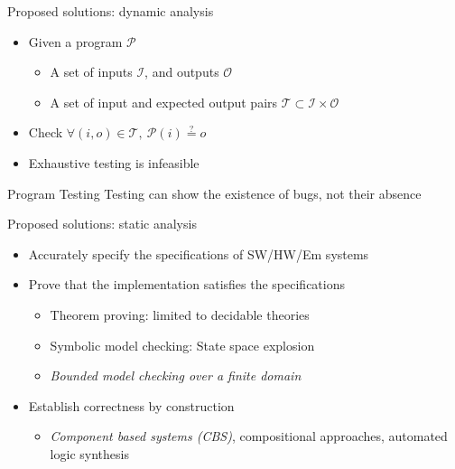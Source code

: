 \begin{frame}{Proposed solutions: dynamic analysis}
	 \begin{itemize}
	 	\item 
		 Given a program $\mathcal{P}$
		 \begin{itemize}
		   \item A set of inputs $\mathcal{I}$, and outputs $\mathcal{O}$
		   \item A set of input and expected output pairs $\mathcal{T} \subset \mathcal{I} \times \mathcal{O}$
		 \end{itemize}
		\item 
		 Check $\forall (i,o) \in \mathcal{T},~\mathcal{P}(i) \stackrel{?}{=} o$
		\item 
		 Exhaustive testing is infeasible
	 \end{itemize}
	 \begin{block}{Program Testing}
	 Testing can show the existence of bugs, not their absence~\cite{ammann2008introduction}
	 \end{block}
\end{frame}


\begin{frame}{Proposed solutions: static analysis}
  \begin{itemize}
	 	\item 
		 Accurately specify the specifications of SW/HW/Em systems
		\item 
		 Prove that the implementation satisfies the specifications 
      \begin{itemize}
        \item Theorem proving: limited  to decidable theories~\cite{ouimet2007formal}
        \item Symbolic model checking: State space explosion~\cite{baier2008principles}
        \item {\em Bounded model checking over a finite domain}~\cite{biere2003bounded}
	    \end{itemize}
		\item
	     Establish correctness by construction 
      \begin{itemize}
        \item {\em Component based systems (CBS)}, compositional approaches, automated logic synthesis
	    \end{itemize}
  \end{itemize}
\end{frame}

